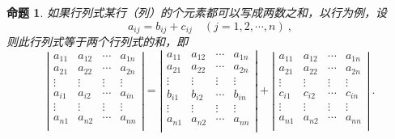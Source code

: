 \documentclass[zihao=-4,UTF8,linespread=1.8,nothm]{aytony_base}
\newtheorem*{proposition*}{\indent 命题}
\begin{document}
\begin{proposition*}
    如果行列式某行（列）的个元素都可以写成两数之和，以行为例，设 $$
        a_{ij} = b_{ij}  + c_{ij}\quad (j = 1, 2, \cdots, n)\ ,
    $$ 则此行列式等于两个行列式的和，即 $$
        \left|
        \begin{matrix}
            a_{11} & a_{12} & \cdots & a_{1n} \\
            a_{21} & a_{22} & \cdots & a_{2n} \\
            \vdots & \vdots & \vdots & \vdots \\
            a_{i1} & a_{i2} & \cdots & a_{in} \\
            \vdots & \vdots & \vdots & \vdots \\
            a_{n1} & a_{n2} & \cdots & a_{nn} \\
        \end{matrix}
        \right| = \left|
        \begin{matrix}
            a_{11} & a_{12} & \cdots & a_{1n} \\
            a_{21} & a_{22} & \cdots & a_{2n} \\
            \vdots & \vdots & \vdots & \vdots \\
            b_{i1} & b_{i2} & \cdots & b_{in} \\
            \vdots & \vdots & \vdots & \vdots \\
            a_{n1} & a_{n2} & \cdots & a_{nn} \\
        \end{matrix}
        \right| + \left|
        \begin{matrix}
            a_{11} & a_{12} & \cdots & a_{1n} \\
            a_{21} & a_{22} & \cdots & a_{2n} \\
            \vdots & \vdots & \vdots & \vdots \\
            c_{i1} & c_{i2} & \cdots & c_{in} \\
            \vdots & \vdots & \vdots & \vdots \\
            a_{n1} & a_{n2} & \cdots & a_{nn} \\
        \end{matrix}
        \right|\ .
    $$
\end{proposition*}
\end{document}
